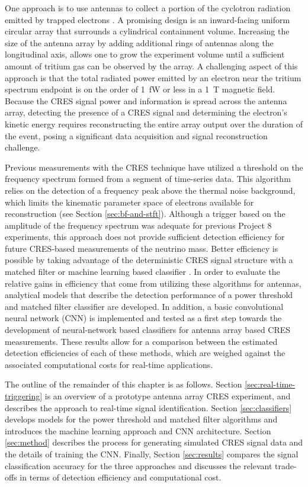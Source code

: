 One approach is to use antennas to collect a portion of the cyclotron radiation emitted by trapped electrons \cite{p8snowmass2022, p8jphysg}. A promising design is an inward-facing uniform circular array that surrounds a cylindrical containment volume. Increasing the size of the antenna array by adding additional rings of antennas along the longitudinal axis, allows one to grow the experiment volume until a sufficient amount of tritium gas can be observed by the array. A challenging aspect of this approach is that the total radiated power emitted by an electron near the tritium spectrum endpoint is on the order of 1~fW or less in a 1~T magnetic field. Because the CRES signal power and information is spread across the antenna array, detecting the presence of a CRES signal and determining the electron's kinetic energy requires reconstructing the entire array output over the duration of the event, posing a significant data acquisition and signal reconstruction challenge.

Previous measurements with the CRES technique have utilized a threshold on the frequency spectrum formed from a segment of time-series data. This algorithm relies on the detection of a frequency peak above the thermal noise background, which limits the kinematic parameter space of electrons available for reconstruction (see Section \ref{sec:bf-and-stft}). Although a trigger based on the amplitude of the frequency spectrum was adequate for previous Project 8 experiments, this approach does not provide sufficient detection efficiency for future CRES-based measurements of the neutrino mass. Better efficiency is possible by taking advantage of the deterministic CRES signal structure with a matched filter or machine learning based classifier \cite{p8ml_1}. In order to evaluate the relative gains in efficiency that come from utilizing these algorithms for antennas, analytical models that describe the detection performance of a power threshold and matched filter classifier are developed. In addition, a basic convolutional neural network (CNN) is implemented and tested as a first step towards the development of neural-network based classifiers for antenna array based CRES measurements. These results allow for a comparison between the estimated detection efficiencies of each of these methods, which are weighed against the associated computational costs for real-time applications.

The outline of the remainder of this chapter is as follows. Section \ref{sec:real-time-triggering} is an overview of a prototype antenna array CRES experiment, and describes the approach to real-time signal identification. Section \ref{sec:classifiers} develops models for the power threshold and matched filter algorithms and introduces the machine learning approach and CNN architecture. Section \ref{sec:method} describes the process for generating simulated CRES signal data and the details of training the CNN. Finally, Section \ref{sec:results} compares the signal classification accuracy for the three approaches and discusses the relevant trade-offs in terms of detection efficiency and computational cost.

